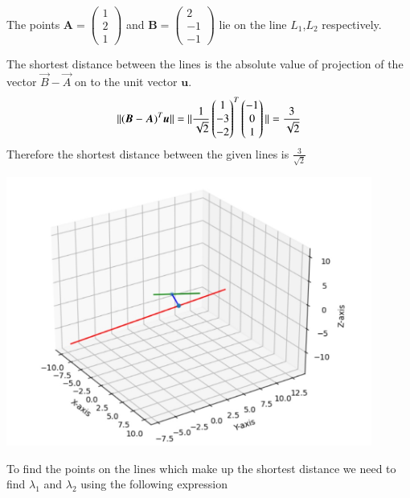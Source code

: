 \documentclass[journal,12pt,twocolumn]{IEEEtran}
\newcommand{\norm}[1]{\| #1 \|}
\begin{document}
The points $\bm{A}=\begin{pmatrix}1\\2\\1\end{pmatrix}$ and $\bm{B}=\begin{pmatrix}2\\-1\\-1\end{pmatrix}$ lie on the line $L_1$,$L_2$ respectively.\par
The shortest distance between the lines is the absolute value of projection of the vector $\vec{B}-\vec{A}$ on to the unit vector $\bm{u}$.
\begin{equation}
    \norm{(\bm{B}-\bm{A})^T\bm{u}}\\
    =\norm{\frac{1}{\sqrt{2}}\begin{pmatrix}1\\-3\\-2\end{pmatrix}^T\begin{pmatrix}-1\\0\\1\end{pmatrix}}\\
    =\frac{3}{\sqrt{2}}
\end{equation}
Therefore the shortest distance between the given lines is $\frac{3}{\sqrt{2}}$
\begin{center}
    \includegraphics[width=12cm]{assignment2.jpg}
\end{center}
To find the points on the lines which make up the shortest distance we need to find $\lambda_1$ and $\lambda_2$ using the following expression\\
\end{document}
